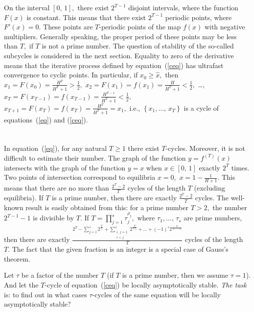 \documentclass[12pt,a4paper]{amsart}
\begin{document}
On the interval $[0,\,1],$ there exist $2^{T-1}$ disjoint intervals, where the function $F(x)$ is constant. This means that there exist $2^{T-1}$ 
periodic points, where $F'(x)=0.$ These points are $T$-periodic points of the map $f(x)$ with negative multipliers. Generally speaking, 
the proper period of these points may be less than $T,$ if $T$ is not a prime number. The question of stability of the so-called subcycles 
is considered in the next section. Equality to zero of the derivative means that the iterative process defined by equation~(\ref{ceq}) has 
ultrafast convergence to cyclic points. In particular, if $x_0 \geq \hat{x},$ then $x_1 = F(x_0) = \frac{H^T}{H^T + 1} > \frac12,$
$x_2 = F(x_1) = f(x_1) = \frac{H}{H^T + 1} < \frac12,$ \ldots , $x_T = F(x_{T-1}) = f(x_{T-1}) = \frac{H^{T-1}}{H^T + 1} < \frac12,$
$x_{T+1} = F(x_T) = f(x_T) = \frac{H^T}{H^T + 1} = x_1,$ i.e., $\left\{ x_1,\ldots,\,x_T\right\}$ is a cycle of equations~(\ref{eq}) and 
(\ref{ceq}). 

\section{}

In equation~(\ref{eq}), for any natural $T \geq 1$ there exist $T$-cycles. Moreover, it is not difficult to estimate their number. The graph of the function 
$y = f^{(T)}(x)$ intersects with the graph of the function $y = x$ when $x\in[0,\,1]$ exactly $2^T$ times. Two points of intersection correspond to 
equilibria $x=0,$ $x = 1 - \frac{1}{H+1}$. This means that there are no more than $\frac{2^T - 2}{T}$ cycles of the length $T$ (excluding equilibria). 
If $T$ is a prime number, then there are exactly $\frac{2^T - 2}{T}$ cycles. The well-known result is easily obtained from this: for a prime number $T>2,$ 
the number $2^{T-1} - 1$ is divisible by $T.$ If $T = \prod\limits_{j=1}^{s} {\tau_{j}^{\rho_j}},$ where $\tau_1,\ldots,\,\tau_s$ are prime numbers, 
then there are exactly $\frac{2^T - \sum\limits_{j=1}^{s}{2^\frac{T}{\tau_j}} + \sum\limits_{\substack{i,\,j=1 \\ i<j}}^{s}{2^\frac{T}{\tau_i \tau_j}} + \ldots +
(-1)^s 2^\frac{T}{\tau_1 \cdot \ldots \cdot \tau_s}}{T}$ cycles of the length $T.$ The fact that the given fraction is an integer is a special case of 
Gauss's theorem.

Let $\tau$ be a factor of the number $T$ (if $T$ is a prime number, then we assume $\tau=1$). And let the $T$-cycle of equation~(\ref{ceq}) 
be locally asymptotically stable. \textit{The task} is: to find out in what cases $\tau$-cycles of the same equation will be locally asymptotically stable?
\end{document}
